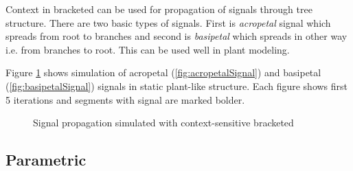 Context in bracketed \lsystems can be used for propagation of signals through tree structure.
There are two basic types of signals.
First is \emph{acropetal} signal which spreads from root to branches and second is \emph{basipetal} which spreads in other way i.e. from branches to root.
This can be used well in plant modeling.

Figure \ref{fig:signalPropagation} shows simulation of acropetal (\ref{fig:acropetalSignal}) and basipetal (\ref{fig:basipetalSignal}) signals in static plant-like structure.
Each figure shows first 5 iterations and segments with signal are marked bolder.

\begin{figure}[ht]
	\centering
	\hfill
	\caption{Signal propagation simulated with context-sensitive bracketed \lsystems}
	\label{fig:signalPropagation}
\end{figure}


\subsection{Parametric \lsystems}

